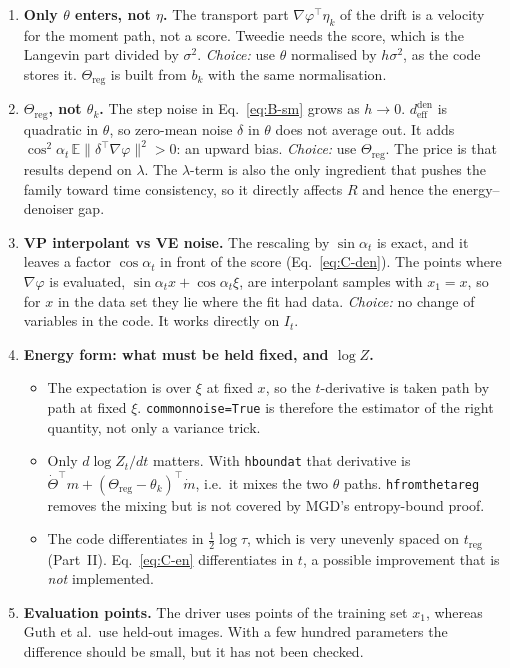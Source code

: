 \documentclass[11pt]{article}
\newcommand{\E}{\mathbb{E}}
\newcommand{\code}[1]{\texttt{#1}}
\renewcommand{\_}{\origunderscore\allowbreak}
\newcommand{\deff}{d_{\mathrm{eff}}}
\begin{document}
\begin{enumerate}
\item \textbf{Only $\theta$ enters, not $\eta$.} The transport part
  $\nabla\varphi^\top\eta_k$ of the drift is a velocity for the moment path, not
  a score. Tweedie needs the score, which is the Langevin part divided by
  $\sigma^2$. \emph{Choice:} use $\theta$ normalised by $h\sigma^2$, as the code stores
  it. $\Theta_{\mathrm{reg}}$ is built from $b_k$ with the same normalisation.

\item \textbf{$\Theta_{\mathrm{reg}}$, not $\theta_k$.} The step noise in Eq.~\ref{eq:B-sm}
  grows as $h\to0$. $\deff^{\mathrm{den}}$ is quadratic in $\theta$, so zero-mean noise
  $\delta$ in $\theta$ does not average out. It adds
  $\cos^2\!\alpha_t\,\E\lVert\delta^\top\nabla\varphi\rVert^2>0$: an upward bias. \emph{Choice:}
  use $\Theta_{\mathrm{reg}}$. The price is that results depend on $\lambda$. The $\lambda$-term
  is also the only ingredient that pushes the family toward time
  consistency, so it directly affects $R$ and hence the energy--denoiser gap.

\item \textbf{VP interpolant vs VE noise.} The rescaling by $\sin\alpha_t$
  is exact, and it leaves a factor $\cos\alpha_t$ in front of the score
  (Eq.~\ref{eq:C-den}). The points where $\nabla\varphi$ is evaluated,
  $\sin\alpha_t x+\cos\alpha_t\xi$, are interpolant samples with $x_1=x$, so for
  $x$ in the data set they lie where the fit had data. \emph{Choice:} no change of variables in the code. It works
  directly on $I_t$.

\item \textbf{Energy form: what must be held fixed, and $\log Z$.}
  \begin{itemize}
  \item The expectation is over $\xi$ at fixed $x$, so the $t$-derivative is taken
    path by path at fixed $\xi$. \code{common\_noise=True} is therefore the estimator
    of the right quantity, not only a variance trick.
  \item Only $d\log Z_t/dt$ matters. With \code{h\_bound\_at} that derivative is
    $\dot\Theta^\top m+(\Theta_{\mathrm{reg}}-\theta_k)^\top\dot m$, i.e.\ it mixes the two $\theta$
    paths. \code{h\_from\_theta\_reg} removes the mixing but is not covered
    by MGD's entropy-bound proof.
  \item The code differentiates in $\tfrac12\log\tau$, which is very unevenly spaced on
    $t_{\mathrm{reg}}$ (Part~II). Eq.~\ref{eq:C-en} differentiates in $t$, a possible
    improvement that is \emph{not} implemented.
  \end{itemize}

\item \textbf{Evaluation points.} The driver uses points of the
  training set $x_1$, whereas Guth et al.\ use held-out images. With a few
  hundred parameters the difference should be small, but it has not been checked.
\end{enumerate}
\end{document}

